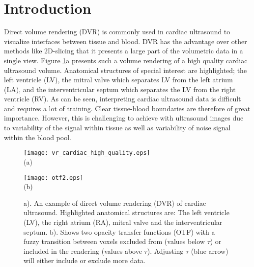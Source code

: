 \section{Introduction}
Direct volume rendering (DVR)\cite{Levoy1988} is commonly used in cardiac ultrasound to visualize interfaces between tissue and blood\cite{steen1994, Rabben2010, kiss2010}. DVR has the advantage over other methods like 2D-slicing that it presents a large part of the volumetric data in a single view. Figure \ref{fig:dvr}a presents such a volume rendering of a high quality cardiac ultrasound volume. Anatomical structures of special interest are highlighted; the left ventricle (LV), the mitral valve which separates LV from the left atrium (LA), and the interventricular septum which separates the LV from the right ventricle (RV). As can be seen, interpreting cardiac ultrasound data is difficult and requires a lot of training. Clear tissue-blood boundaries are therefore of great importance. However, this is challenging to achieve with ultrasound images due to variability of the signal within tissue as well as variability of noise signal within the blood pool.
\begin{figure}  
\begin{center}
\begin{minipage}[b]{0.5\linewidth}\centering
\texttt{[image: vr\_cardiac\_high\_quality.eps]}\\
(a)
\end{minipage}%
\hspace{-5em}
\begin{minipage}[b]{0.6\linewidth}\centering
\texttt{[image: otf2.eps]}\\
(b)
\end{minipage} 
\end{center}
\caption[example] { \label{fig:dvr}  a). An example of direct volume rendering (DVR) of cardiac ultrasound. Highlighted anatomical structures are: The left ventricle (LV), the right atrium (RA), mitral valve and the interventricular septum.  b). Shows two opacity transfer functions (OTF) with a fuzzy transition between voxels excluded from (values below $\tau$) or included in the rendering (values above $\tau$). Adjusting $\tau$ (blue arrow) will either include or exclude more data.}
\end{figure} 

